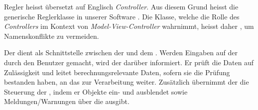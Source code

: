 Regler  heisst \"ubersetzt  auf Englisch  \emph{Controller}. Aus diesem  Grund
heisst die generische Reglerklasse  in unserer Software . Die
Klasse,   welche   die   Rolle   des   \emph{Controllers}   im   Kontext   von
\emph{Model-View-Controller} wahrnimmt, heisst  daher , um
Namenskonflikte zu vermeiden.


Der  dient als  Schnittstelle zwischen der  und
dem  . Werden  Eingaben auf  der    durch den  Benutzer
gemacht, wird  der   dar\"uber informiert. Er  pr\"uft die
Daten  auf  Zul\"assigkeit  und   leitet  berechnungsrelevante  Daten,  sofern
sie  die  Pr\"ufung bestanden  haben,  an  das   zur  Verarbeitung
weiter. Zus\"atzlich  \"ubernimmt der   die  Steuerung der
, indem  er Objekte  ein- und ausblendet  sowie Meldungen/Warnungen
\"uber die  ausgibt.
